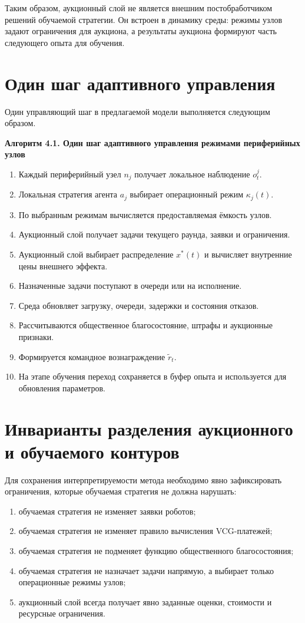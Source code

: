 Таким образом, аукционный слой не является внешним постобработчиком решений обучаемой стратегии. Он встроен в динамику среды: режимы узлов задают ограничения для аукциона, а результаты аукциона формируют часть следующего опыта для обучения.

\section{Один шаг адаптивного управления}

Один управляющий шаг в предлагаемой модели выполняется следующим образом.

\textbf{Алгоритм 4.1. Один шаг адаптивного управления режимами периферийных узлов}
\begin{enumerate}
    \item Каждый периферийный узел $n_j$ получает локальное наблюдение $o^j_t$.
    \item Локальная стратегия агента $a_j$ выбирает операционный режим $\kappa_j(t)$.
    \item По выбранным режимам вычисляется предоставляемая ёмкость узлов.
    \item Аукционный слой получает задачи текущего раунда, заявки и ограничения.
    \item Аукционный слой выбирает распределение $x^*(t)$ и вычисляет внутренние цены внешнего эффекта.
    \item Назначенные задачи поступают в очереди или на исполнение.
    \item Среда обновляет загрузку, очереди, задержки и состояния отказов.
    \item Рассчитываются общественное благосостояние, штрафы и аукционные признаки.
    \item Формируется командное вознаграждение $\tilde{r}_t$.
    \item На этапе обучения переход сохраняется в буфер опыта и используется для обновления параметров.
\end{enumerate}

\section{Инварианты разделения аукционного и обучаемого контуров}

Для сохранения интерпретируемости метода необходимо явно зафиксировать ограничения, которые обучаемая стратегия не должна нарушать:
\begin{enumerate}
    \item обучаемая стратегия не изменяет заявки роботов;
    \item обучаемая стратегия не изменяет правило вычисления VCG-платежей;
    \item обучаемая стратегия не подменяет функцию общественного благосостояния;
    \item обучаемая стратегия не назначает задачи напрямую, а выбирает только операционные режимы узлов;
    \item аукционный слой всегда получает явно заданные оценки, стоимости и ресурсные ограничения.
\end{enumerate}

